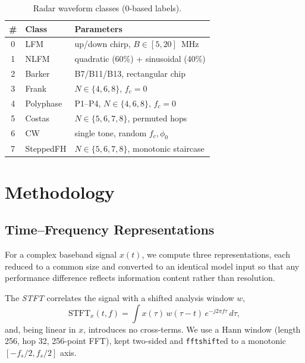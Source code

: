 \documentclass[journal]{IEEEtran}
\begin{document}
\begin{table}[t]
\centering
\caption{Radar waveform classes (0-based labels).}
\label{tab:classes}
\begin{tabular}{@{}cll@{}}
\toprule
\# & Class & Parameters \\
\midrule
0 & LFM & up/down chirp, $B\in[5,20]$~MHz \\
1 & NLFM & quadratic (60\%) + sinusoidal (40\%) \\
2 & Barker & B7/B11/B13, rectangular chip \\
3 & Frank & $N\in\{4,6,8\}$, $f_c=0$ \\
4 & Polyphase & P1--P4, $N\in\{4,6,8\}$, $f_c=0$ \\
5 & Costas & $N\in\{5,6,7,8\}$, permuted hops \\
6 & CW & single tone, random $f_c,\phi_0$ \\
7 & SteppedFH & $N\in\{5,6,7,8\}$, monotonic staircase \\
\bottomrule
\end{tabular}
\end{table}

\section{Methodology}
\label{sec:method}
\subsection{Time--Frequency Representations}
For a complex baseband signal $x(t)$, we compute three representations, each
reduced to a common size and converted to an identical model input so that any
performance difference reflects information content rather than resolution.

The \emph{STFT} correlates the signal with a shifted analysis window $w$,
\begin{equation}
\mathrm{STFT}_x(t,f) = \int x(\tau)\, w(\tau-t)\, e^{-j2\pi f\tau}\, d\tau ,
\end{equation}
and, being linear in $x$, introduces no cross-terms. We use a Hann window
(length 256, hop 32, 256-point FFT), kept two-sided and \texttt{fftshift}ed to a
monotonic $[-f_s/2, f_s/2]$ axis.
\end{document}
